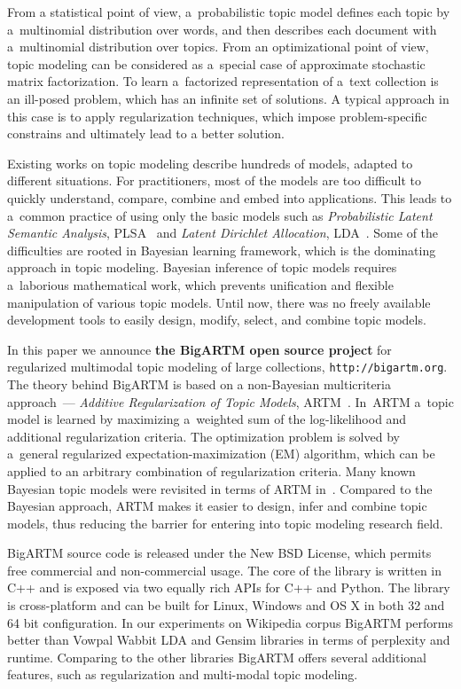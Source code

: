 \documentclass[russian]{llncs}
\begin{document}
From a statistical point of view, a~probabilistic topic model
defines each topic by a~multinomial distribution over words,
and then describes each document with a~multinomial distribution over topics.
From an optimizational point of view,
topic modeling can be considered as a~special case
of approximate stochastic matrix factorization.
To learn a~factorized representation of a~text collection
is an ill-posed problem, which has an infinite set of solutions.
A typical approach in this case is to apply regularization techniques,
which impose problem-specific constrains
and ultimately lead to a better solution.

Existing works on topic modeling describe hundreds of models, adapted to different situations.
For practitioners, most of the models are too difficult to quickly
understand, compare, combine and embed into applications.
This leads to a~common practice of using only the basic models such as
\emph{Probabilistic Latent Semantic Analysis}, PLSA~\cite{hofmann99plsi} and
\emph{Latent Dirichlet Allocation}, LDA~\cite{blei03latent}.
Some of the difficulties are rooted in Bayesian learning framework,
which is the dominating approach in topic modeling.
Bayesian inference of topic models requires a~laborious mathematical work,
which prevents unification and flexible manipulation of various topic models.
Until now, there was no freely available development tools
to easily design, modify, select, and combine topic models.

In this paper we announce \textbf{the BigARTM open source project} for
regularized multimodal topic modeling of large collections,
\texttt{http://bigartm.org}.
The theory behind BigARTM is based on a non-Bayesian multicriteria approach~---
\emph{Additive Regularization of Topic Models}, ARTM~\cite{voron14dan-eng}.
In~ARTM a~topic model is learned by maximizing a~weighted sum
of the log-likelihood and additional regularization criteria.
The optimization problem is solved by a~general regularized expectation-maximization (EM) algorithm,
which can be applied to an arbitrary combination of regularization criteria.
Many known Bayesian topic models were revisited in terms of ARTM in~\cite{voron14aist,voron14mlj}.
Compared to the Bayesian approach,
ARTM makes it easier to design, infer and combine topic models,
thus reducing the barrier for entering into topic modeling research field.

BigARTM source code is released under the New BSD License, which permits free commercial and non-commercial usage.
The core of the library is written in C++ and is exposed via two equally rich APIs for C++ and Python.
The library is cross-platform and can be built for Linux, Windows and OS X in both 32 and 64 bit configuration.
In our experiments on Wikipedia corpus BigARTM performs better than Vowpal Wabbit LDA and Gensim libraries
in terms of perplexity and runtime.
Comparing to the other libraries BigARTM offers several additional features,
such as regularization and multi-modal topic modeling.
\end{document}
